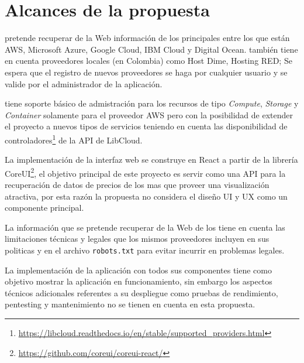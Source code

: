 \chapter{Alcances de la propuesta} %

\label{ch:alcances} %



\appName pretende recuperar de la Web información de los principales  entre los que están \acrshort{AWS}, \gls{Microsoft Azure}, \gls{Google Cloud}, \gls{IBM Cloud} y \gls{Digital Ocean}. \appName también tiene en cuenta proveedores locales (en Colombia) como \gls{Host Dime}, \gls{Hosting RED}; Se espera que el registro de nuevos proveedores se haga por cualquier usuario y se valide por el administrador de la aplicación.\bigskip

\appName tiene soporte básico de admistración para los recursos de tipo \emph{Compute}, \emph{Storage} y \emph{Container} solamente para el proveedor \acrshort{AWS} pero con la posibilidad de extender el proyecto a nuevos tipos de servicios teniendo en cuenta las disponibilidad de controladores\footnote{\url{https://libcloud.readthedocs.io/en/stable/supported_providers.html}} de la API de \gls{LibCloud}. \bigskip

La implementación de la interfaz web se construye en \gls{React} a partir de la librería \gls{CoreUI}\footnote{\url{https://github.com/coreui/coreui-react/}}, el objetivo principal de este proyecto es servir como una \acrshort{API} para la recuperación de datos de precios de los  mas que proveer una visualización atractiva, por esta razón la propuesta no considera el diseño \acrshort{UI} y \acrshort{UX} como un componente principal.\bigskip

La información que se pretende recuperar de la Web de los  tiene en cuenta las limitaciones técnicas y legales que los mismos proveedores incluyen en sus politicas y en el archivo \texttt{robots.txt} para evitar incurrir en problemas legales. \bigskip

La implementación de la aplicación con todos sus componentes tiene como objetivo mostrar la aplicación en funcionamiento, sin embargo los aspectos técnicos adicionales referentes a su despliegue como pruebas de rendimiento, pentesting y mantenimiento no se tienen en cuenta en esta propuesta.